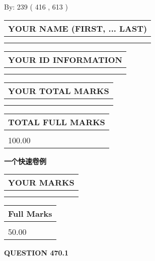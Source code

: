 \documentclass{ctexart}
\begin{document}
   
\hspace{1.0in} By: 
 239 ( 416 ,  613 )
   
   
   
   
\newpage 
\setcounter{page}{ 
   470001 } 
   
   
   
   
\noindent\begin{tabular}{|l|}
\hline
YOUR NAME (FIRST, ... LAST)  \\
\hline
 \\ 
 \\ 
\hline
\end{tabular}
\hspace{0.05in} \begin{tabular}{|l|}
\hline
 YOUR   ID   INFORMATION  \\
\hline
 \\ 
 \\ 
\hline
\end{tabular}
   
   
\vspace{0.2in}\noindent\begin{tabular}{|l|}
\hline
YOUR TOTAL MARKS  \\
\hline
 \\ 
 \\ 
\hline
\end{tabular}
\hspace{0.05in} \begin{tabular}{|l|}
\hline
TOTAL FULL MARKS  \\
\hline
 \\ 
100.00 \\
\hline
\end{tabular}
   
   
 \vspace{0.2in}
{\LARGE {\textbf{ 一个快速卷例}}}
   
   
  
\vspace{0.2in}
  
\noindent\begin{tabular}{|l|}
\hline
 YOUR MARKS  \\
\hline
 \\ 
 \\ 
\hline
\end{tabular}
\hspace{0.05in} \begin{tabular}{|l|}
\hline
 Full Marks  \\
\hline
 \\ 
50.00 \\
\hline
\end{tabular}
{\textbf{\Large{QUESTION
470.1 
}}}
  
\end{document}

